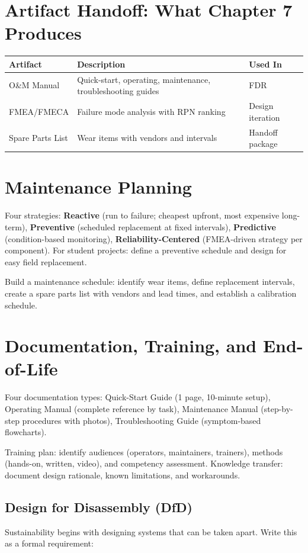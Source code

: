 \section{Artifact Handoff: What Chapter 7 Produces}
\begin{table}[htbp]\centering\small
\begin{tabularx}{\textwidth}{l X l}
\toprule
\textbf{Artifact} & \textbf{Description} & \textbf{Used In} \\
\midrule
O\&M Manual & Quick-start, operating, maintenance, troubleshooting guides & FDR \\
FMEA/FMECA & Failure mode analysis with RPN ranking & Design iteration \\
Spare Parts List & Wear items with vendors and intervals & Handoff package \\
\bottomrule
\end{tabularx}
\end{table}

\section{Maintenance Planning}
Four strategies: \textbf{Reactive} (run to failure; cheapest upfront, most expensive long-term), \textbf{Preventive} (scheduled replacement at fixed intervals), \textbf{Predictive} (condition-based monitoring), \textbf{Reliability-Centered} (FMEA-driven strategy per component). For student projects: define a preventive schedule and design for easy field replacement.

Build a maintenance schedule: identify wear items, define replacement intervals, create a spare parts list with vendors and lead times, and establish a calibration schedule.

\section{Documentation, Training, and End-of-Life}
Four documentation types: Quick-Start Guide (1 page, 10-minute setup), Operating Manual (complete reference by task), Maintenance Manual (step-by-step procedures with photos), Troubleshooting Guide (symptom-based flowcharts).

Training plan: identify audiences (operators, maintainers, trainers), methods (hands-on, written, video), and competency assessment. Knowledge transfer: document design rationale, known limitations, and workarounds.


\subsection{Design for Disassembly (DfD)}
Sustainability begins with designing systems that can be taken apart. Write this as a formal requirement:

